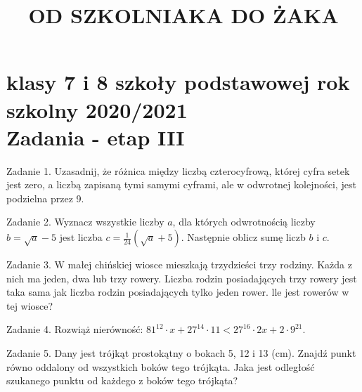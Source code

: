 \documentclass[10pt]{article}
\title{OD SZKOLNIAKA DO ŻAKA }
\author{}
\date{}
\begin{document}
\maketitle
\section*{klasy 7 i 8 szkoły podstawowej rok szkolny 2020/2021 \\
 Zadania - etap III}
Zadanie 1. Uzasadnij, że różnica między liczbą czterocyfrową, której cyfra setek jest zero, a liczbą zapisaną tymi samymi cyframi, ale w odwrotnej kolejności, jest podzielna przez 9.

Zadanie 2. Wyznacz wszystkie liczby \(a\), dla których odwrotnością liczby \(b=\sqrt{a}-5\) jest liczba \(c=\frac{1}{24}(\sqrt{a}+5)\). Następnie oblicz sumę liczb \(b\) i \(c\).

Zadanie 3. W małej chińskiej wiosce mieszkają trzydzieści trzy rodziny. Każda z nich ma jeden, dwa lub trzy rowery. Liczba rodzin posiadających trzy rowery jest taka sama jak liczba rodzin posiadających tylko jeden rower. lle jest rowerów w tej wiosce?

Zadanie 4. Rozwiąż nierówność: \(81^{12} \cdot x+27^{14} \cdot 11<27^{16} \cdot 2 x+2 \cdot 9^{21}\).

Zadanie 5. Dany jest trójkąt prostokątny o bokach 5, 12 i 13 (cm). Znajdź punkt równo oddalony od wszystkich boków tego trójkąta. Jaka jest odległość szukanego punktu od każdego z boków tego trójkąta?
\end{document}
